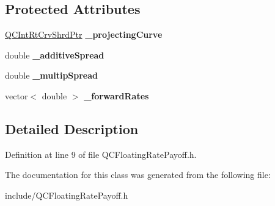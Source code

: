 \subsection*{Protected Attributes}
\begin{DoxyCompactItemize}
\item 
\hypertarget{class_q_c_floating_rate_payoff_aa9db777cb92a9ee15b04f36dbdcb7320}{\hyperlink{_q_c_definitions_8h_a4b4fb466e49550e3dfd40003562cd19d}{Q\+C\+Int\+Rt\+Crv\+Shrd\+Ptr} {\bfseries \+\_\+projecting\+Curve}}\label{class_q_c_floating_rate_payoff_aa9db777cb92a9ee15b04f36dbdcb7320}

\item 
\hypertarget{class_q_c_floating_rate_payoff_a0ce362b934004dc4e1e60a0900b304ca}{double {\bfseries \+\_\+additive\+Spread}}\label{class_q_c_floating_rate_payoff_a0ce362b934004dc4e1e60a0900b304ca}

\item 
\hypertarget{class_q_c_floating_rate_payoff_a39f140ca9f175dc8ad9f471f6c11de81}{double {\bfseries \+\_\+multip\+Spread}}\label{class_q_c_floating_rate_payoff_a39f140ca9f175dc8ad9f471f6c11de81}

\item 
\hypertarget{class_q_c_floating_rate_payoff_aa6208ed72da94cb4cfb241f9fe78bdaf}{vector$<$ double $>$ {\bfseries \+\_\+forward\+Rates}}\label{class_q_c_floating_rate_payoff_aa6208ed72da94cb4cfb241f9fe78bdaf}

\end{DoxyCompactItemize}


\subsection{Detailed Description}


Definition at line 9 of file Q\+C\+Floating\+Rate\+Payoff.\+h.



The documentation for this class was generated from the following file\+:\begin{DoxyCompactItemize}
\item 
include/Q\+C\+Floating\+Rate\+Payoff.\+h\end{DoxyCompactItemize}
